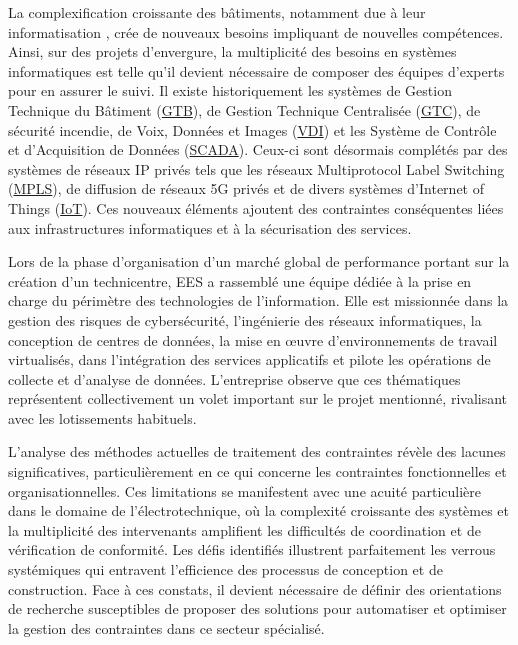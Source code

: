 \documentclass[a4paper,12pt]{article}
\begin{document}
La complexification croissante des bâtiments, notamment due à leur informatisation \autocite{DecretNdeg20208872020,SmartReadinessIndicatora}, crée de nouveaux besoins impliquant de nouvelles compétences. Ainsi, sur des projets d’envergure, la multiplicité des besoins en systèmes informatiques est telle qu’il devient nécessaire de composer des équipes d'experts pour en assurer le suivi. Il existe historiquement les systèmes de Gestion Technique du Bâtiment
 (\protect\hyperlink{gls-12}{\label{gls-12-use-1}GTB}), de Gestion Technique Centralisée
 (\protect\hyperlink{gls-13}{\label{gls-13-use-1}GTC}), de sécurité incendie, de Voix, Données et Images
 (\protect\hyperlink{gls-14}{\label{gls-14-use-1}VDI}) et les Système de Contrôle et d'Acquisition de Données
 (\protect\hyperlink{gls-15}{\label{gls-15-use-1}SCADA}). Ceux-ci sont désormais complétés par des systèmes de réseaux IP privés tels que les réseaux Multiprotocol Label Switching
 (\protect\hyperlink{gls-16}{\label{gls-16-use-1}MPLS}), de diffusion de réseaux 5G privés et de divers systèmes d’Internet of Things
 (\protect\hyperlink{gls-17}{\label{gls-17-use-1}IoT}). Ces nouveaux éléments ajoutent des contraintes conséquentes liées aux infrastructures informatiques et à la sécurisation des services.

Lors de la phase d’organisation d’un marché global de performance portant sur la création d’un technicentre, EES a rassemblé une équipe dédiée à la prise en charge du périmètre des technologies de l’information. Elle est missionnée dans la gestion des risques de cybersécurité, l'ingénierie des réseaux informatiques, la conception de centres de données, la mise en œuvre d’environnements de travail virtualisés, dans l’intégration des services applicatifs et pilote les opérations de collecte et d’analyse de données. L’entreprise observe que ces thématiques représentent collectivement un volet important sur le projet mentionné, rivalisant avec les lotissements habituels. 

L'analyse des méthodes actuelles de traitement des contraintes révèle des lacunes significatives, particulièrement en ce qui concerne les contraintes fonctionnelles et organisationnelles. Ces limitations se manifestent avec une acuité particulière dans le domaine de l'électrotechnique, où la complexité croissante des systèmes et la multiplicité des intervenants amplifient les difficultés de coordination et de vérification de conformité. Les défis identifiés illustrent parfaitement les verrous systémiques qui entravent l'efficience des processus de conception et de construction. Face à ces constats, il devient nécessaire de définir des orientations de recherche susceptibles de proposer des solutions pour automatiser et optimiser la gestion des contraintes dans ce secteur spécialisé.
\end{document}

